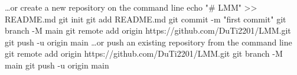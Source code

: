 …or create a new repository on the command line
echo "# LMM" >> README.md
git init
git add README.md
git commit -m "first commit"
git branch -M main
git remote add origin https://github.com/DuTi2201/LMM.git
git push -u origin main
…or push an existing repository from the command line
git remote add origin https://github.com/DuTi2201/LMM.git
git branch -M main
git push -u origin main